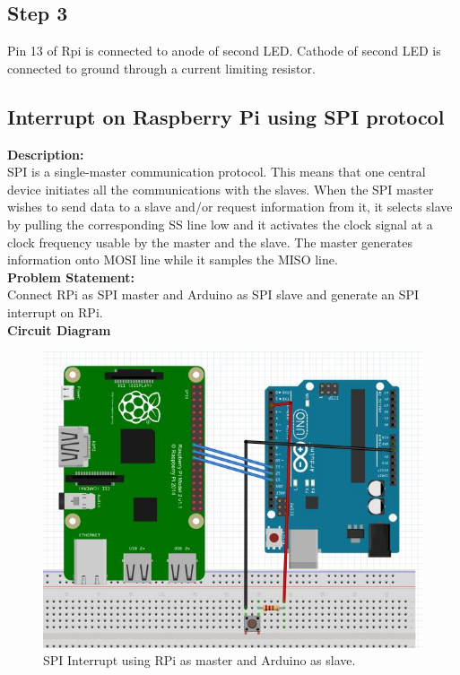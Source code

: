 \documentclass[a4paper,12pt,oneside]{book}
\begin{document}
\subsection*{Step 3}
Pin 13 of Rpi is connected to anode of second LED. Cathode of second LED is connected to ground through a current limiting resistor.

\subsection*{Interrupt on Raspberry Pi using SPI protocol}
\textbf{Description:} \\
SPI is a single-master communication protocol. This means that one
central device initiates all the communications with the slaves. When the SPI master wishes to send data to a slave and/or request information from it, it selects slave by pulling the corresponding SS line low and it activates the clock signal at a clock frequency usable by the master and the slave. The master generates information onto MOSI line while it samples the MISO line.\\
\textbf{Problem Statement:} \\
Connect RPi as SPI master and Arduino as SPI slave and generate an SPI interrupt on RPi.\\
\textbf{Circuit Diagram}  \\
\begin{figure}[H]
    \centering
    \includegraphics[scale = 0.6]{rpi_with_arduino_spi}
    \caption{SPI Interrupt using RPi as master and Arduino as slave.}
\end{figure}
\end{document}
